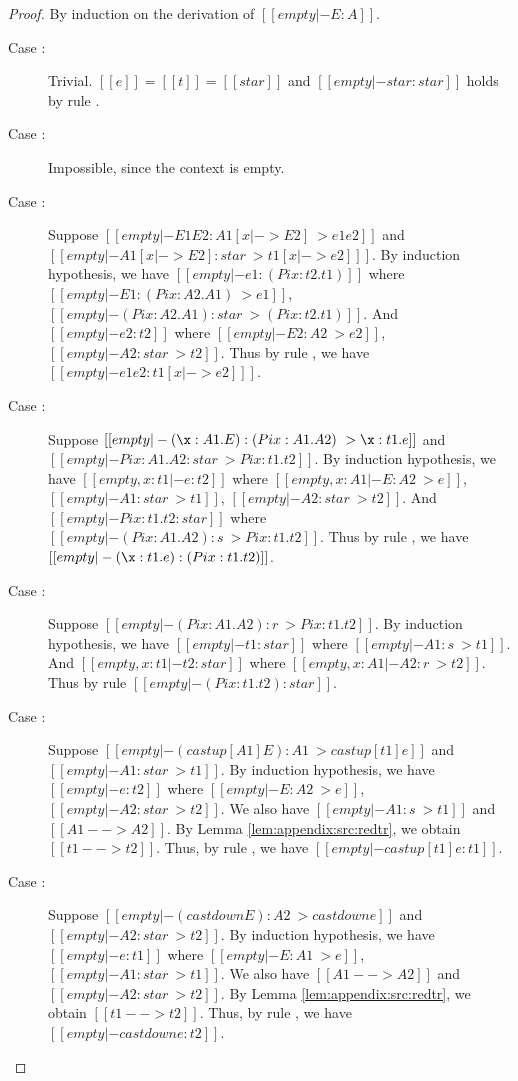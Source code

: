 \begin{proof}
    By induction on the derivation of $[[empty |- E : A]]$.
    \begin{description}
        \item[Case :] Trivial. $[[e]] = [[t]] = [[star]]$ and $[[empty |- star:star]]$ holds by rule .
        \item[Case :] Impossible, since the context is empty.
        \item[Case :] Suppose $[[empty |- E1 E2 : A1[x |-> E2] ~> e1 e2]]$ and $[[empty |- A1[x |-> E2] : star ~> t1 [x |-> e2] ]]$. By induction hypothesis, we have $[[empty |- e1 : (Pi x:t2.t1)]]$ where $[[empty |- E1 : (Pi x:A2.A1) ~> e1]]$, $[[empty |- (Pi x:A2.A1) : star ~> (Pi x:t2.t1)]]$. And $[[empty |- e2:t2]]$ where $[[empty |- E2 : A2 ~> e2]]$, $[[empty |- A2 : star ~> t2]]$. Thus by rule , we have $[[empty |- e1 e2 : t1 [x |-> e2] ]]$.
        \item[Case :] Suppose $[[empty |- (\x:A1.E):(Pi x:A1.A2) ~> \x:t1.e]]$ and $[[empty |- Pi x:A1.A2 : star ~> Pi x:t1.t2]]$. By induction hypothesis, we have $[[empty, x : t1 |- e:t2]]$ where $[[empty, x : A1 |- E : A2 ~> e]]$, $[[empty |- A1 : star ~> t1]]$, $[[empty |- A2 : star ~> t2]]$. And $[[empty |- Pi x:t1.t2 : star]]$ where $[[empty |- (Pi x:A1.A2) : s ~> Pi x:t1.t2]]$. Thus by rule , we have $[[empty |- (\x:t1.e):(Pi x:t1.t2)]]$.
        \item[Case :] Suppose $[[empty |- (Pi x:A1.A2):r ~> Pi x:t1.t2]]$. By induction hypothesis, we have $[[empty |- t1 : star]]$ where $[[empty |- A1 : s ~> t1]]$. And $[[empty, x : t1 |- t2 : star]]$ where $[[empty, x: A1 |- A2 : r ~> t2]]$. Thus by rule  $[[empty |- (Pi x:t1.t2) : star]]$.
        \item[Case :] Suppose $[[empty |- (castup[A1] E):A1 ~> castup[t1] e]]$ and $[[empty |- A1 : star ~> t1]]$. By induction hypothesis, we have $[[empty |- e : t2]]$ where $[[empty |- E : A2 ~> e]]$, $[[empty |- A2 : star ~> t2]]$. We also have $[[empty |- A1 : s ~> t1]]$ and $[[A1 --> A2]]$. By Lemma \ref{lem:appendix:src:redtr}, we obtain $[[t1 --> t2]]$. Thus, by rule , we have $[[empty |- castup[t1] e : t1]]$.
        \item[Case :] Suppose $[[empty |- (castdown E) : A2 ~> castdown e]]$ and $[[empty |- A2 : star ~> t2]]$. By induction hypothesis, we have $[[empty |- e : t1]]$ where $[[empty |- E : A1 ~> e]]$, $[[empty |- A1 : star ~> t1]]$. We also have $[[A1 --> A2]]$ and $[[empty |- A2 : star ~> t2]]$. By Lemma \ref{lem:appendix:src:redtr}, we obtain $[[t1 --> t2]]$. Thus, by rule , we have $[[empty |- castdown e : t2]]$.

\end{description}
\end{proof}
